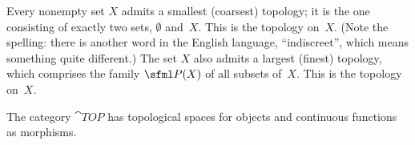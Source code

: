 \begin{exam} Every nonempty set $X$ admits a smallest (coarsest) topology; it is the one consisting of exactly two sets,
$\emptyset$ and~$X$.  This is the
 topology on~$X$. (Note the spelling: there is another word in the English language, ``indiscreet'',
which means something quite different.)  The set $X$ also admits a largest (finest) topology, which comprises the
family $\sfml P(X)$ of all subsets of~$X$.  This is the
 topology on~$X$.
  \end{exam}

\begin{exam} The category
$\cat{TOP}$ has topological spaces for objects and continuous functions as morphisms.
\end{exam}

